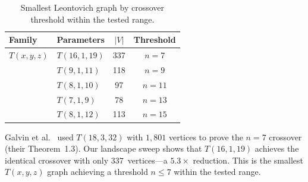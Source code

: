 \begin{table}[H]
\centering
\caption{Smallest Leontovich graph by crossover threshold within the tested
range.}
\label{tab:thresholds}
\begin{tabular}{@{}llcc@{}}
  \toprule
  Family & Parameters & $|V|$ & Threshold \\
  \midrule
  $T(x,y,z)$ & $T(16, 1, 19)$ & 337 & $n = 7$ \\
              & $T(9, 1, 11)$  & 118 & $n = 9$ \\
              & $T(8, 1, 10)$  &  97 & $n = 11$ \\
              & $T(7, 1, 9)$   &  78 & $n = 13$ \\
              & $T(8, 1, 12)$  & 113 & $n = 15$ \\
  \bottomrule
\end{tabular}
\end{table}

\begin{remark}
  Galvin et al.~\cite{galvin2025} used $T(18,3,32)$ with $1{,}801$ vertices to prove
  the $n = 7$ crossover (their Theorem~1.3). Our landscape sweep shows
  that $T(16,1,19)$ achieves the identical crossover with only
  $337$~vertices---a $5.3\times$ reduction.  This is the smallest
  $T(x,y,z)$ graph achieving a threshold $n \le 7$ within the tested range.
\end{remark}

